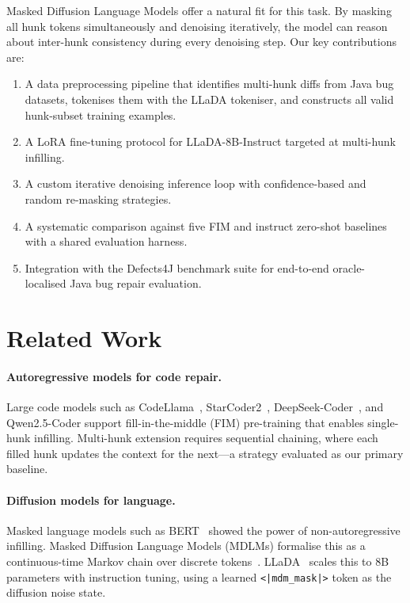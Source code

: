 \documentclass[11pt,a4paper]{article}
\begin{document}
Masked Diffusion Language Models offer a natural fit for this task. By masking all hunk tokens simultaneously and denoising iteratively, the model can reason about inter-hunk consistency during every denoising step. Our key contributions are:

\begin{enumerate}[leftmargin=*, label=\textbf{\arabic*.}]
  \item A data preprocessing pipeline that identifies multi-hunk diffs from Java bug datasets, tokenises them with the LLaDA tokeniser, and constructs all valid hunk-subset training examples.
  \item A LoRA fine-tuning protocol for LLaDA-8B-Instruct targeted at multi-hunk infilling.
  \item A custom iterative denoising inference loop with confidence-based and random re-masking strategies.
  \item A systematic comparison against five FIM and instruct zero-shot baselines with a shared evaluation harness.
  \item Integration with the Defects4J benchmark suite for end-to-end oracle-localised Java bug repair evaluation.
\end{enumerate}

\section{Related Work}

\paragraph{Autoregressive models for code repair.}
Large code models such as CodeLlama~\cite{codellama}, StarCoder2~\cite{starcoder2}, DeepSeek-Coder~\cite{deepseek}, and Qwen2.5-Coder support fill-in-the-middle (FIM) pre-training that enables single-hunk infilling. Multi-hunk extension requires sequential chaining, where each filled hunk updates the context for the next—a strategy evaluated as our primary baseline.

\paragraph{Diffusion models for language.}
Masked language models such as BERT~\cite{bert} showed the power of non-autoregressive infilling. Masked Diffusion Language Models (MDLMs) formalise this as a continuous-time Markov chain over discrete tokens~\cite{austin2021structured, sahoo2024mdlm}. LLaDA~\cite{llada2024} scales this to 8B parameters with instruction tuning, using a learned \texttt{<|mdm\_mask|>} token as the diffusion noise state.
\end{document}
